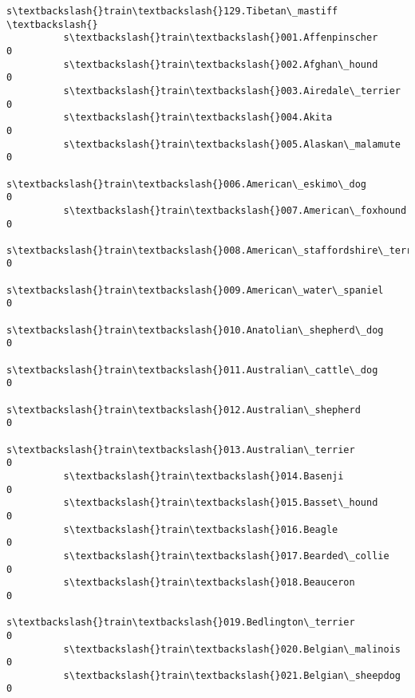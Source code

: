 \documentclass[11pt]{article}
\begin{document}
\begin{Verbatim}[commandchars=\\\{\}]
                                                          s\textbackslash{}train\textbackslash{}129.Tibetan\_mastiff  \textbackslash{}
          s\textbackslash{}train\textbackslash{}001.Affenpinscher                                                 0   
          s\textbackslash{}train\textbackslash{}002.Afghan\_hound                                                  0   
          s\textbackslash{}train\textbackslash{}003.Airedale\_terrier                                              0   
          s\textbackslash{}train\textbackslash{}004.Akita                                                         0   
          s\textbackslash{}train\textbackslash{}005.Alaskan\_malamute                                              0   
          s\textbackslash{}train\textbackslash{}006.American\_eskimo\_dog                                           0   
          s\textbackslash{}train\textbackslash{}007.American\_foxhound                                             0   
          s\textbackslash{}train\textbackslash{}008.American\_staffordshire\_terrier                                0   
          s\textbackslash{}train\textbackslash{}009.American\_water\_spaniel                                        0   
          s\textbackslash{}train\textbackslash{}010.Anatolian\_shepherd\_dog                                        0   
          s\textbackslash{}train\textbackslash{}011.Australian\_cattle\_dog                                         0   
          s\textbackslash{}train\textbackslash{}012.Australian\_shepherd                                           0   
          s\textbackslash{}train\textbackslash{}013.Australian\_terrier                                            0   
          s\textbackslash{}train\textbackslash{}014.Basenji                                                       0   
          s\textbackslash{}train\textbackslash{}015.Basset\_hound                                                  0   
          s\textbackslash{}train\textbackslash{}016.Beagle                                                        0   
          s\textbackslash{}train\textbackslash{}017.Bearded\_collie                                                0   
          s\textbackslash{}train\textbackslash{}018.Beauceron                                                     0   
          s\textbackslash{}train\textbackslash{}019.Bedlington\_terrier                                            0   
          s\textbackslash{}train\textbackslash{}020.Belgian\_malinois                                              0   
          s\textbackslash{}train\textbackslash{}021.Belgian\_sheepdog                                              0   

\end{Verbatim}
\end{document}
